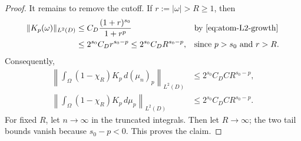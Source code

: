 \documentclass[11pt]{amsart}
\theoremstyle{definition}
\theoremstyle{remark}
\begin{document}
\begin{proof}
It remains to remove the cutoff.  If $r:=|\omega|>R\ge1$, then
\begin{align*}
	\|K_p(\omega)\|_{L^2(D)}
	&\le C_D\frac{(1+r)^{s_0}}{1+r^p}
	&&\text{by \eqref{eq:atom-L2-growth}}\\
	&\le 2^{s_0}C_Dr^{s_0-p}
	\le 2^{s_0}C_DR^{s_0-p},
	&&\text{since $p>s_0$ and $r>R$.}
\end{align*}
Consequently,
\begin{align*}
	\left\|\int_\Omega(1-\chi_R)K_p\,d(\mu_n)_p\right\|_{L^2(D)}
	&\le 2^{s_0}C_DCR^{s_0-p},\\
	\left\|\int_\Omega(1-\chi_R)K_p\,d\mu_p\right\|_{L^2(D)}
	&\le 2^{s_0}C_DCR^{s_0-p}.
\end{align*}
For fixed $R$, let $n\to\infty$ in the truncated integrals.  Then let
$R\to\infty$; the two tail bounds vanish because $s_0-p<0$.  This proves
the claim.
\end{proof}
\end{document}
